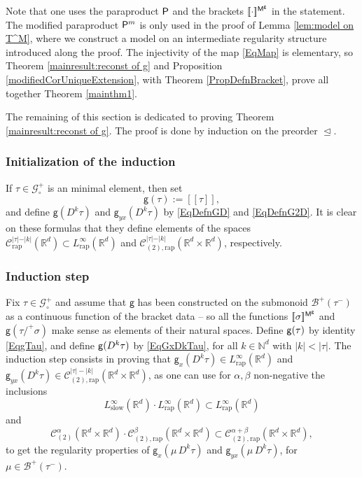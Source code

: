 \documentclass[11pt]{article}
\numberwithin{equation}{section}
\theoremstyle{plain}
\theoremstyle{definition}
\newcommand{\Brac}[1]{[\![#1]\!]}
\newcommand{\rap}{\mathrm{rap}}
\newcommand{\slow}{\mathrm{slow}}
\newcommand{\sfg}{\mathsf{g}}
\let\pord\trianglelefteq
\newcommand{\bbN}{\mathbb{N}}
\newcommand{\bbR}{\mathbb{R}}
\newcommand{\mcB}{\mathcal{B}}
\newcommand{\mcC}{\mathcal{C}}
\newcommand{\mcG}{\mathcal{G}}
\begin{document}
Note that one uses the paraproduct $\sf P$ and the brackets $\Brac{\cdot}^{\sf M^g}$ in the statement. The modified paraproduct ${\sf P}^m$ is only used in the proof of Lemma \ref{lem:model on T^M}, where we construct a model on an intermediate regularity structure introduced along the proof. The injectivity of the map \eqref{EqMap} is elementary, so Theorem \ref{mainresult:reconst of g} and Proposition \ref{modifiedCorUniqueExtension}, with Theorem \ref{PropDefnBracket}, prove all together Theorem \ref{mainthm1}.

The remaining of this section is dedicated to proving Theorem \ref{mainresult:reconst of g}. The proof is done by induction on the preorder $\pord$.

\subsubsection*{Initialization of the induction}
If $\tau\in\mcG_\circ^+$ is an minimal element, then set
\[
\sfg(\tau) := \Brac{\tau},
\]
and define $\sfg(D^k\tau)$ and $\sfg_{yx}(D^k\tau)$ by \eqref{EqDefnGD} and \eqref{EqDefnG2D}. It is clear on these formulas that they define elements of the spaces $\mcC^{\vert\tau\vert-\vert k\vert}_\rap(\bbR^d)\subset L^\infty_\rap(\bbR^d)$ and $\mcC^{\vert\tau\vert-\vert k\vert}_{(2),\rap}(\bbR^d\times\bbR^d)$, respectively.

\subsubsection*{Induction step}
Fix $\tau\in\mcG_\circ^+$ and assume that $\sfg$ has been constructed on the submonoid $\mcB^+(\tau^-)$ as a continuous function of the bracket data -- so all the functions $\Brac{\sigma}^{{\sf M}^\sfg}$ and ${\sfg}(\tau/^+\sigma)$ make sense as elements of their natural spaces. Define ${\sf g}(\tau)$ by identity \eqref{EqgTau}, and define ${\sf g}(D^k\tau)$ by \eqref{EqGxDkTau}, for all $k\in\bbN^d$ with $\vert k\vert<\vert\tau\vert$. The induction step consists in proving that $\sfg_x(D^k\tau)\in L_\rap^\infty(\bbR^d)$ and ${\sfg}_{yx}(D^k\tau)\in\mcC^{|\tau|-|k|}_{(2),\rap}(\bbR^d\times\bbR^d)$, as one can use for $\alpha,\beta$ non-negative the inclusions
\[
L_\slow^\infty(\bbR^d)\cdot L_\rap^\infty(\bbR^d)\subset L_\rap^\infty(\bbR^d)
\]
and
\[
\mcC_{(2)}^\alpha(\bbR^d\times\bbR^d)\cdot\mcC_{(2),\rap}^\beta(\bbR^d\times\bbR^d)\subset\mcC_{(2),\rap}^{\alpha+\beta}(\bbR^d\times\bbR^d),
\]
to get the regularity properties of $\sfg_x(\mu\,D^k\tau)$ and $\sfg_{yx}(\mu\,D^k\tau)$, for $\mu\in\mcB^+(\tau^-)$.
\end{document}
